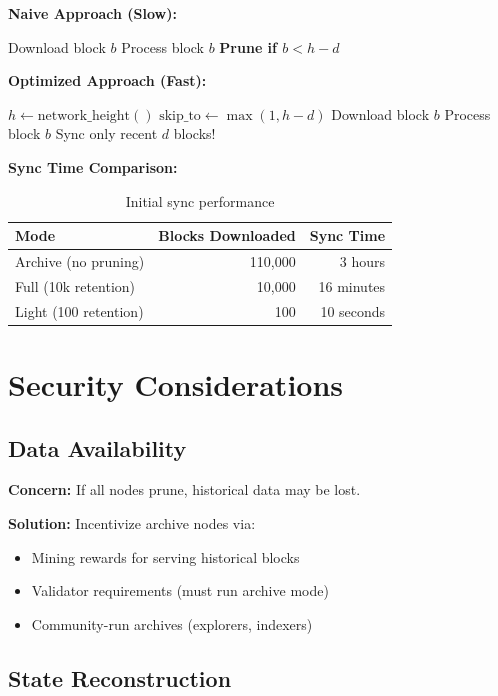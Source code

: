 \documentclass[11pt,a4paper]{article}
\begin{document}
\textbf{Naive Approach (Slow):}
\begin{algorithmic}
    \STATE Download block $b$
    \STATE Process block $b$
    \STATE \textbf{Prune if $b < h - d$}  
\ENDFOR
\end{algorithmic}

\textbf{Optimized Approach (Fast):}
\begin{algorithmic}
\STATE $h \leftarrow \text{network\_height}()$
\STATE $\text{skip\_to} \leftarrow \max(1, h - d)$
    \STATE Download block $b$
    \STATE Process block $b$
\ENDFOR
\STATE Sync only recent $d$ blocks!
\end{algorithmic}

\textbf{Sync Time Comparison:}
\begin{table}[h]
\centering
\begin{tabular}{lrr}
\toprule
\textbf{Mode} & \textbf{Blocks Downloaded} & \textbf{Sync Time} \\
\midrule
Archive (no pruning) & 110,000 & 3 hours \\
Full (10k retention) & 10,000 & 16 minutes \\
Light (100 retention) & 100 & 10 seconds \\
\bottomrule
\end{tabular}
\caption{Initial sync performance}
\end{table}

\section{Security Considerations}

\subsection{Data Availability}

\textbf{Concern:} If all nodes prune, historical data may be lost.

\textbf{Solution:} Incentivize archive nodes via:
\begin{itemize}
\item Mining rewards for serving historical blocks
\item Validator requirements (must run archive mode)
\item Community-run archives (explorers, indexers)
\end{itemize}

\subsection{State Reconstruction}
\end{document}
